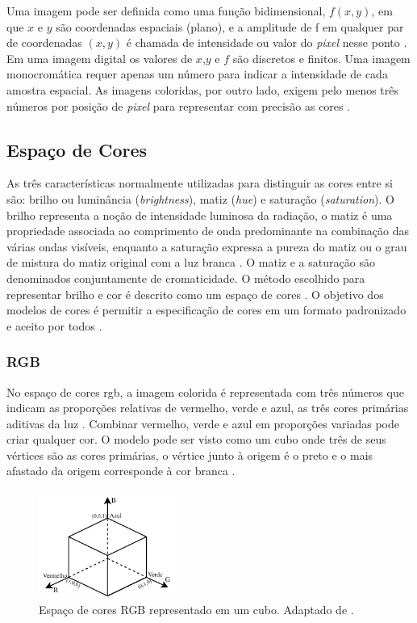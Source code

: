 Uma imagem pode ser definida como uma função bidimensional, $f(x,y)$, em que $x$ e $y$ são coordenadas espaciais (plano), e a amplitude de f em qualquer par de coordenadas $(x, y)$ é chamada de intensidade ou valor do \textit{pixel} nesse ponto \cite{gonzalez2009processamento}. Em uma imagem digital os valores de $x$,$y$ e $f$ são discretos e finitos. 
Uma imagem monocromática requer apenas um número para indicar a intensidade de cada amostra espacial. As imagens coloridas, por outro lado, exigem pelo menos três números por posição de \textit{pixel} para representar com precisão as cores \cite{richardson2010h}.

\subsection{Espaço de Cores}

As três características normalmente utilizadas para distinguir as cores entre si são: brilho ou luminância (\textit{brightness}), matiz (\textit{hue}) e saturação (\textit{saturation}). O brilho representa a noção de intensidade luminosa da radiação, o matiz é uma propriedade associada ao comprimento de onda predominante na combinação das várias ondas visíveis, enquanto a saturação expressa a pureza do matiz ou o grau de mistura do matiz original com a luz branca \cite{marques1999processamento}. O matiz e a saturação são denominados conjuntamente de cromaticidade.
O método escolhido para representar brilho e cor é descrito como um espaço de cores \cite{richardson2010h}. O objetivo dos modelos de cores é permitir a especificação de cores em um formato padronizado e aceito por todos \cite{gonzalez2009processamento}. 

\subsubsection{RGB}
No espaço de cores \gls{rgb}, a imagem colorida é representada com três números que indicam as proporções relativas de vermelho, verde e azul, as três cores primárias aditivas da luz \cite{richardson2010h}. Combinar vermelho, verde e azul em proporções variadas pode criar qualquer cor. O modelo pode ser visto como um cubo onde três de seus vértices são as cores primárias, o vértice junto à origem é o preto e o mais afastado da origem corresponde à cor branca \cite{gonzalez2009processamento}. 

\begin{figure}[h]
	\centering
	\includegraphics[width=0.4\textwidth]{figuras/rgb.pdf}
	\caption[Espaço tridimensional de cores RGB.]{Espaço de cores RGB representado em um cubo. Adaptado de \cite{gonzalez2009processamento}.}
	\label{fig:rgb}
\end{figure}

